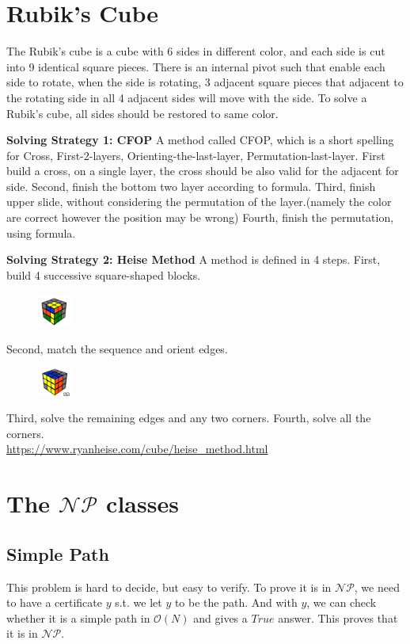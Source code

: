 \documentclass[A4paper]{article}
\begin{document}
\section{Rubik's Cube}
The Rubik's cube is a cube with 6 sides in different color, and each side is cut into 9 identical square pieces. There is an internal pivot such that enable each side to rotate, when the side is rotating, 3 adjacent square pieces that adjacent to the rotating side in all 4 adjacent sides will move with the side. To solve a Rubik's cube, all sides should be restored to same color. \\
\par \textbf{Solving Strategy 1: CFOP} A method called CFOP, which is a short spelling for Cross, First-2-layers, Orienting-the-last-layer, Permutation-last-layer. First build a cross, on a single layer, the cross should be also valid for the adjacent for side. Second, finish the bottom two layer according to formula. Third, finish upper slide, without considering the permutation of the layer.(namely the color are correct however the position may be wrong) Fourth, finish the permutation, using formula.
\par \textbf{Solving Strategy 2: Heise Method}  A method is defined in 4 steps. First, build 4 successive square-shaped blocks. 
\begin{figure}[!htbp]
\centering
\includegraphics[width=0.1\textwidth]{HW3_pb1.png}
\end{figure}
\begin{flushleft}
Second, match the sequence and orient edges.
\end{flushleft}
\begin{figure}[!htbp]
\centering
\includegraphics[width=0.1\textwidth]{HW3_pb2.png}
\end{figure}
Third, solve the remaining edges and any two corners. Fourth, solve all the corners. \\
\url{https://www.ryanheise.com/cube/heise_method.html} 
\section{The $\mathcal{NP}$ classes}
\subsection{Simple Path}
This problem is hard to decide, but easy to verify. To prove it is in $\mathcal{NP}$, we need to have a certificate $y$ s.t. we let $y$ to be the path. And with $y$, we can check whether it is a simple path in $\mathcal{O}(N)$ and gives a $True$ answer. This proves that it is in $\mathcal{NP}$.
\end{document}
